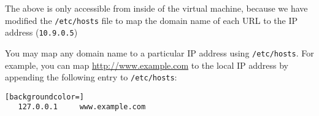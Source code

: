 
The above \urlisorurlsare is only accessible from inside of the virtual machine, because we
have modified the \texttt{/etc/hosts} file to map the domain
name of each URL to the IP address ({\tt 10.9.0.5}) 

You may map any domain name to a particular IP address using
\texttt{/etc/hosts}. For example, you can map
\url{http://www.example.com} to the local IP address by appending the
following entry to \texttt{/etc/hosts}:

\begin{lstlisting}[backgroundcolor=]
   127.0.0.1     www.example.com
\end{lstlisting}




